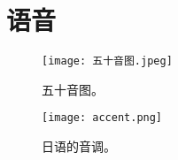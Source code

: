 \section{语音}%

\begin{figure}[b]
  \centering
  \texttt{[image: 五十音图.jpeg]}
  \caption{五十音图。}
  \label{fig:phonetic}
\end{figure}

\begin{figure}[b]
  \centering
  \texttt{[image: accent.png]}
  \caption{日语的音调。}
  \label{fig:phonetic}
\end{figure}

